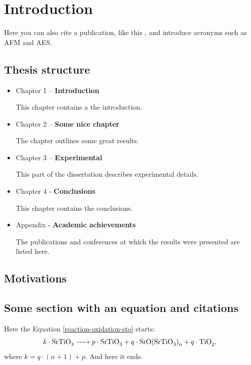\chapter{Introduction}


\lipsum[12]


Here you can also cite a publication, like this \cite{Cie2022}, and introduce acronyms such as \ac{AFM} and \ac{AES}.


\section{Thesis structure}

\lipsum[4]


\begin{itemize}
	\item Chapter 1 – \textbf{Introduction}
	
	This chapter contains a the introduction. 
	
	\item Chapter 2 – \textbf{Some nice chapter}
	
	The chapter outlines some great results.
	
	\item Chapter 3 – \textbf{Experimental}
	
	This part of the dissertation describes experimental details.

	\item Chapter 4 - \textbf{Conclusions}
	
	This chapter contains the conclusions.

	\item Appendix - \textbf{Academic achievements}
	
	The publications and conferences at which  the results were presented are listed here. 
\end{itemize}

\section{Motivations}

\lipsum[5-7]


\section{Some section with an equation and citations}


Here the Equation \ref{reaction-oxidation-sto} starts:
\begin{equation}
	k \cdot \ce{ SrTiO3} \ce{->} p \cdot \ce{ SrTiO3}  +   q \cdot \ce{SrO (SrTiO3)_n} +  q \cdot \ce{TiO2},
	\label{reaction-oxidation-sto}
\end{equation}
where $k = q\cdot (n+1) + p$. And here it ends.


